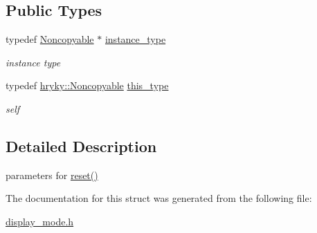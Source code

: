 \subsection*{Public Types}
\begin{DoxyCompactItemize}
\item 
\hypertarget{classhryky_1_1_noncopyable_aaf87abb55f700af85ecb0895f6178821}{typedef \hyperlink{classhryky_1_1_noncopyable}{Noncopyable} $\ast$ \hyperlink{classhryky_1_1_noncopyable_aaf87abb55f700af85ecb0895f6178821}{instance\-\_\-type}}\label{classhryky_1_1_noncopyable_aaf87abb55f700af85ecb0895f6178821}

\begin{DoxyCompactList}\small\item\em instance type \end{DoxyCompactList}\item 
\hypertarget{classhryky_1_1_noncopyable_acf13ad1c98a76247a561dff514979da5}{typedef \hyperlink{classhryky_1_1_noncopyable}{hryky\-::\-Noncopyable} \hyperlink{classhryky_1_1_noncopyable_acf13ad1c98a76247a561dff514979da5}{this\-\_\-type}}\label{classhryky_1_1_noncopyable_acf13ad1c98a76247a561dff514979da5}

\begin{DoxyCompactList}\small\item\em self \end{DoxyCompactList}\end{DoxyCompactItemize}


\subsection{Detailed Description}
parameters for \hyperlink{classhryky_1_1display_1_1_mode_a6826c1efd764c64520bf954f480444d4}{reset()} 

The documentation for this struct was generated from the following file\-:\begin{DoxyCompactItemize}
\item 
\hyperlink{display__mode_8h}{display\-\_\-mode.\-h}\end{DoxyCompactItemize}
